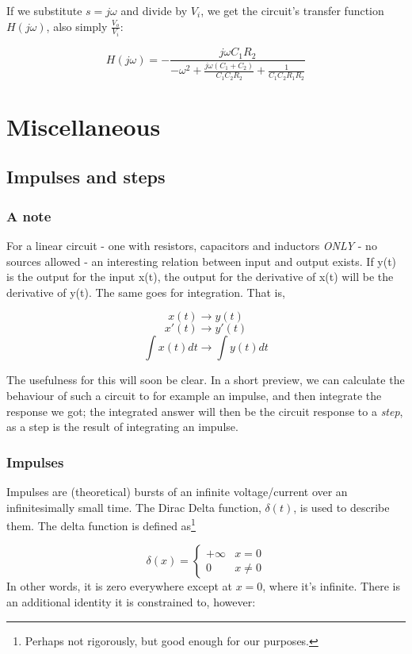 \documentclass[12pt,a4paper]{report}
\begin{document}
If we substitute $s = j\omega$ and divide by $V_i$, we get the circuit's transfer function $H(j\omega)$, also simply $\displaystyle \frac{V_o}{V_i}$:

\large
\[ H(j\omega) = - \frac{j \omega C_1 R_2}{-\omega^2 + \frac{j\omega(C_1 + C_2)}{C_1 C_2 R_2} + \frac{1}{C_1 C_2 R_1 R_2}} \]
\normalsize


\chapter{Miscellaneous}
\section{Impulses and steps}

\subsection{A note}
For a linear circuit - one with resistors, capacitors and inductors \emph{ONLY} - no sources allowed - an interesting relation between input and output exists. If y(t) is the output for the input x(t), the output for the derivative of x(t) will be the derivative of y(t). The same goes for integration. That is,

\[ x(t) \to y(t) \]
\[ x'(t) \to y'(t) \]
\[ \int x(t) dt \to \int y(t) dt \]

The usefulness for this will soon be clear. In a short preview, we can calculate the behaviour of such a circuit to for example an impulse, and then integrate the response we got; the integrated answer will then be the circuit response to a \emph{step}, as a step is the result of integrating an impulse.

\subsection{Impulses}
Impulses are (theoretical) bursts of an infinite voltage/current over an infinitesimally small time. The Dirac Delta function, $\delta(t)$, is used to describe them. The delta function is defined as\footnote{Perhaps not rigorously, but good enough for our purposes.}

\[ \delta(x) = \begin{cases}
   +\infty & x = 0 \\
   0       & x \neq 0
   \end{cases}
\]
In other words, it is zero everywhere except at $x = 0$, where it's infinite. There is an additional identity it is constrained to, however:
\end{document}
